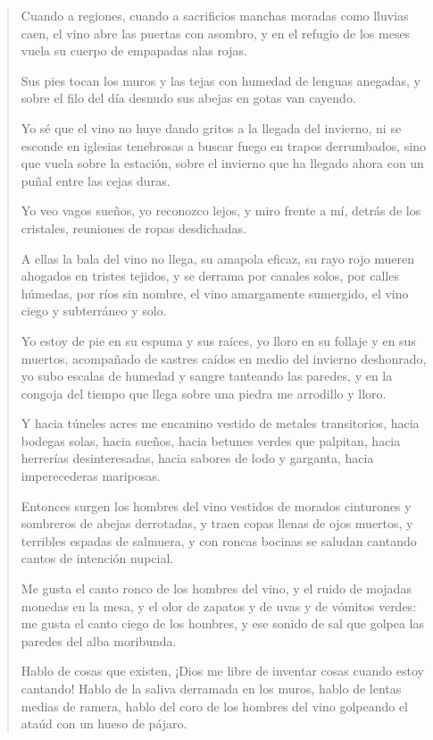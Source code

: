 \documentclass[12pt]{article}
\begin{document}
\clearpage
{}
\begin{verse}
Cuando a regiones, cuando a sacrificios
manchas moradas como lluvias caen,
el vino abre las puertas con asombro,
y en el refugio de los meses vuela
su cuerpo de empapadas alas rojas.

Sus pies tocan los muros y las tejas
con humedad de lenguas anegadas,
y sobre el filo del día desnudo
sus abejas en gotas van cayendo.

Yo sé que el vino no huye dando gritos
a la llegada del invierno,
ni se esconde en iglesias tenebrosas
a buscar fuego en trapos derrumbados,
sino que vuela sobre la estación,
sobre el invierno que ha llegado ahora
con un puñal entre las cejas duras.

Yo veo vagos sueños,
yo reconozco lejos,
y miro frente a mí, detrás de los cristales,
reuniones de ropas desdichadas.

A ellas la bala del vino no llega,
su amapola eficaz, su rayo rojo
mueren ahogados en tristes tejidos,
y se derrama por canales solos,
por calles húmedas, por ríos sin nombre,
el vino amargamente sumergido,
el vino ciego y subterráneo y solo.

Yo estoy de pie en su espuma y sus raíces,
yo lloro en su follaje y en sus muertos,
acompañado de sastres caídos
en medio del invierno deshonrado,
yo subo escalas de humedad y sangre
tanteando las paredes,
y en la congoja del tiempo que llega
sobre una piedra me arrodillo y lloro.

Y hacia túneles acres me encamino
vestido de metales transitorios,
hacia bodegas solas, hacia sueños,
hacia betunes verdes que palpitan,
hacia herrerías desinteresadas,
hacia sabores de lodo y garganta,
hacia imperecederas mariposas.

Entonces surgen los hombres del vino
vestidos de morados cinturones
y sombreros de abejas derrotadas,
y traen copas llenas de ojos muertos,
y terribles espadas de salmuera,
y con roncas bocinas se saludan
cantando cantos de intención nupcial.

Me gusta el canto ronco de los hombres del vino,
y el ruido de mojadas monedas en la mesa,
y el olor de zapatos y de uvas
y de vómitos verdes:
me gusta el canto ciego de los hombres,
y ese sonido de sal que golpea
las paredes del alba moribunda.

Hablo de cosas que existen, ¡Dios me libre
de inventar cosas cuando estoy cantando!
Hablo de la saliva derramada en los muros,
hablo de lentas medias de ramera,
hablo del coro de los hombres del vino
golpeando el ataúd con un hueso de pájaro.


\end{verse}
\end{document}

